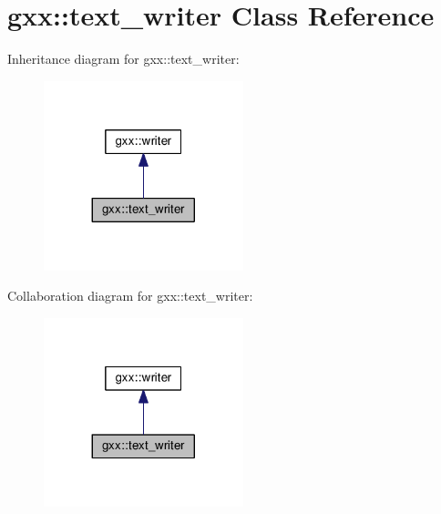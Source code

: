 \hypertarget{classgxx_1_1text__writer}{}\section{gxx\+:\+:text\+\_\+writer Class Reference}
\label{classgxx_1_1text__writer}


Inheritance diagram for gxx\+:\+:text\+\_\+writer\+:
\nopagebreak
\begin{figure}[H]
\begin{center}
\leavevmode
\includegraphics[width=164pt]{classgxx_1_1text__writer__inherit__graph}
\end{center}
\end{figure}


Collaboration diagram for gxx\+:\+:text\+\_\+writer\+:
\nopagebreak
\begin{figure}[H]
\begin{center}
\leavevmode
\includegraphics[width=164pt]{classgxx_1_1text__writer__coll__graph}
\end{center}
\end{figure}
